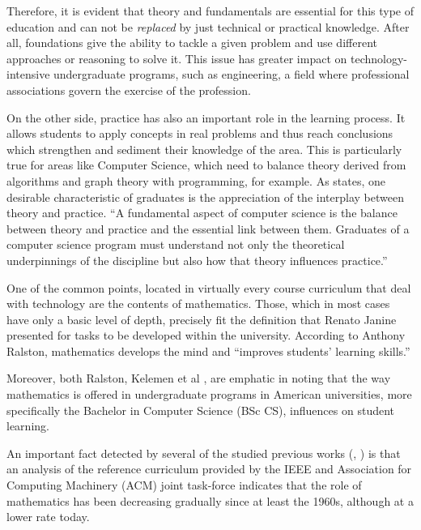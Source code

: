 \documentclass[conference]{IEEEtran}
\begin{document}
	Therefore, it is evident that theory and fundamentals are essential for this type of education and can not be \emph{replaced} by just technical or practical knowledge. After all, foundations give the ability to tackle a given problem and use different approaches or reasoning to solve it. This issue has greater impact on technology-intensive undergraduate programs, such as engineering, a field where professional associations govern the exercise of the profession.

	On the other side, practice has also an important role in the learning process. It allows students to apply concepts in real problems and thus reach conclusions which strengthen and sediment their knowledge of the area. This is particularly true for areas like Computer Science, which need to balance theory derived from algorithms and graph theory with programming, for example. As \cite{cs2008} states, one desirable characteristic of graduates is the appreciation of the interplay between theory and practice. ``A fundamental aspect of computer science is the balance between theory and practice and the essential link between them. Graduates of a computer science program must understand not only the theoretical underpinnings of the discipline but also how that theory influences practice.''

	One of the common points, located in virtually every course curriculum that deal with technology are the contents of mathematics. Those, which in most cases have only a basic level of depth, precisely fit the definition that Renato Janine presented for tasks to be developed within the university. According to Anthony Ralston, mathematics develops the mind and ``improves students' learning skills.'' \cite{ralston:do_need_mathematics}

	Moreover, both Ralston, Kelemen et al \cite{kelemen:has_become_math_phobic}, are emphatic in noting that the way mathematics is offered in undergraduate programs in American universities, more specifically the Bachelor in Computer Science (BSc CS), influences on student learning.

	An important fact detected by several of the studied previous works (\cite{ralston:do_need_mathematics}, \cite{tucker:our_curriculum_math_phobic}) is that an analysis of the reference curriculum provided by the IEEE and Association for Computing Machinery (ACM) joint task-force \cite{cs2001} \cite{cs2008} indicates that the role of mathematics has been decreasing gradually since at least the 1960s, although at a lower rate today.
\end{document}
